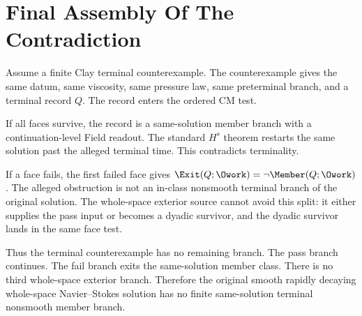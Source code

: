 \section{Final Assembly Of The Contradiction}

Assume a finite Clay terminal counterexample.
The counterexample gives the same datum, same viscosity, same pressure law, same preterminal branch, and a terminal record \(Q\).
The record enters the ordered CM test.

If all faces survive, the record is a same-solution member branch with a continuation-level Field readout.
The standard \(H^s\) theorem restarts the same solution past the alleged terminal time.
This contradicts terminality.

If a face fails, the first failed face gives \(\Exit(Q;\Owork)=\neg\Member(Q;\Owork)\).
The alleged obstruction is not an in-class nonsmooth terminal branch of the original solution.
The whole-space exterior source cannot avoid this split: it either supplies the pass input or becomes a dyadic survivor, and the dyadic survivor lands in the same face test.

Thus the terminal counterexample has no remaining branch.
The pass branch continues.
The fail branch exits the same-solution member class.
There is no third whole-space exterior branch.
Therefore the original smooth rapidly decaying whole-space Navier--Stokes solution has no finite same-solution terminal nonsmooth member branch.
